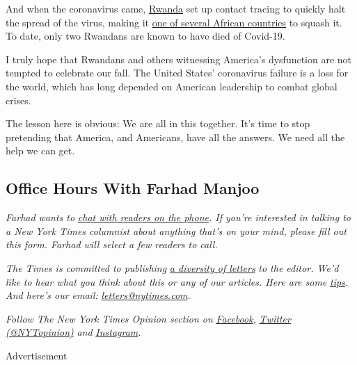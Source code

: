 And when the coronavirus came,
\href{https://www.newyorker.com/news/news-desk/what-african-nations-are-teaching-the-west-about-fighting-the-coronavirus}{Rwanda}
set up contact tracing to quickly halt the spread of the virus, making
it
\href{https://www.newyorker.com/news/news-desk/what-african-nations-are-teaching-the-west-about-fighting-the-coronavirus}{one
of several African countries} to squash it. To date, only two Rwandans
are known to have died of Covid-19.

I truly hope that Rwandans and others witnessing America's dysfunction
are not tempted to celebrate our fall. The United States' coronavirus
failure is a loss for the world, which has long depended on American
leadership to combat global crises.

The lesson here is obvious: We are all in this together. It's time to
stop pretending that America, and Americans, have all the answers. We
need all the help we can get.

\hypertarget{office-hours-with-farhad-manjoo}{%
\subsection{Office Hours With Farhad
Manjoo}\label{office-hours-with-farhad-manjoo}}

\emph{Farhad wants to}
\href{https://www.nytimes.com/2019/05/16/opinion/farhad-office-hours.html?module=inline}{\emph{chat
with readers on the phone}}\emph{. If you're interested in talking to a
New York Times columnist about anything that's on your mind, please fill
out this form. Farhad will select a few readers to call.}

\emph{The Times is committed to publishing}
\href{https://www.nytimes.com/2019/01/31/opinion/letters/letters-to-editor-new-york-times-women.html}{\emph{a
diversity of letters}} \emph{to the editor. We'd like to hear what you
think about this or any of our articles. Here are some}
\href{https://help.nytimes.com/hc/en-us/articles/115014925288-How-to-submit-a-letter-to-the-editor}{\emph{tips}}\emph{.
And here's our email:}
\href{mailto:letters@nytimes.com}{\emph{letters@nytimes.com}}\emph{.}

\emph{Follow The New York Times Opinion section on}
\href{https://www.facebook.com/nytopinion}{\emph{Facebook}}\emph{,}
\href{http://twitter.com/NYTOpinion}{\emph{Twitter (@NYTopinion)}}
\emph{and}
\href{https://www.instagram.com/nytopinion/}{\emph{Instagram}}\emph{.}

Advertisement

